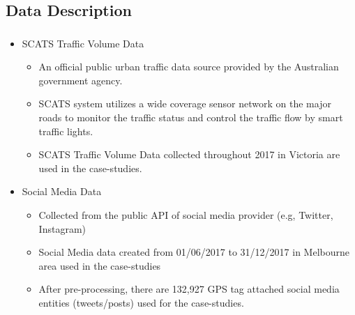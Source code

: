 \subsection{Data Description}
\begin{frame}
    \frametitle{}
    \begin{itemize}
	    \item SCATS Traffic Volume Data
	    \begin{itemize} \small
	        \item An official public urban traffic data source provided by the Australian government agency.
	        \item SCATS system utilizes a wide coverage sensor network on the major roads to monitor the traffic status and control the traffic flow by smart traffic lights.
	        \item SCATS Traffic Volume Data collected throughout 2017 in Victoria are used in the case-studies.
	    \end{itemize}
	    \item Social Media Data
	        \begin{itemize} \small
	            \item Collected from the public API of social media provider (e.g, Twitter, Instagram)
	            \item Social Media data created from 01/06/2017 to 31/12/2017 in Melbourne area used in the case-studies
	            \item After pre-processing, there are 132,927 GPS tag attached social media entities (tweets/posts) used for the case-studies.
	        \end{itemize}
    \end{itemize}
\end{frame}

